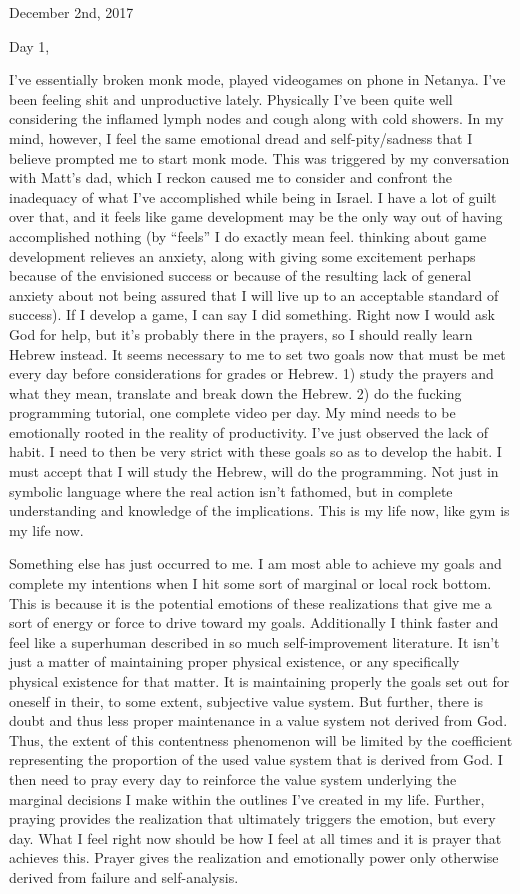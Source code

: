 \bigskip
\bigskip
December 2nd, 2017

Day 1,

I've essentially broken monk mode, played videogames on phone in
Netanya. I've been feeling shit and unproductive lately. Physically I've
been quite well considering the inflamed lymph nodes and cough along
with cold showers. In my mind, however, I feel the same emotional dread
and self-pity/sadness that I believe prompted me to start monk mode.
This was triggered by my conversation with Matt's dad, which I reckon
caused me to consider and confront the inadequacy of what I've
accomplished while being in Israel. I have a lot of guilt over that, and
it feels like game development may be the only way out of having
accomplished nothing (by ``feels'' I do exactly mean feel. thinking
about game development relieves an anxiety, along with giving some
excitement perhaps because of the envisioned success or because of the
resulting lack of general anxiety about not being assured that I will
live up to an acceptable standard of success). If I develop a game, I
can say I did something. Right now I would ask God for help, but it's
probably there in the prayers, so I should really learn Hebrew instead.
It seems necessary to me to set two goals now that must be met every day
before considerations for grades or Hebrew. 1) study the prayers and
what they mean, translate and break down the Hebrew. 2) do the fucking
programming tutorial, one complete video per day. My mind needs to be
emotionally rooted in the reality of productivity. I've just observed
the lack of habit. I need to then be very strict with these goals so as
to develop the habit. I must accept that I will study the Hebrew, will
do the programming. Not just in symbolic language where the real action
isn't fathomed, but in complete understanding and knowledge of the
implications. This is my life now, like gym is my life now.

Something else has just occurred to me. I am most able to achieve my
goals and complete my intentions when I hit some sort of marginal or
local rock bottom. This is because it is the potential emotions of these
realizations that give me a sort of energy or force to drive toward my
goals. Additionally I think faster and feel like a superhuman described
in so much self-improvement literature. It isn't just a matter of
maintaining proper physical existence, or any specifically physical
existence for that matter. It is maintaining properly the goals set out
for oneself in their, to some extent, subjective value system. But
further, there is doubt and thus less proper maintenance in a value
system not derived from God. Thus, the extent of this contentness
phenomenon will be limited by the coefficient representing the
proportion of the used value system that is derived from God. I then
need to pray every day to reinforce the value system underlying the
marginal decisions I make within the outlines I've created in my life.
Further, praying provides the realization that ultimately triggers the
emotion, but every day. What I feel right now should be how I feel at
all times and it is prayer that achieves this. Prayer gives the
realization and emotionally power only otherwise derived from failure
and self-analysis.

